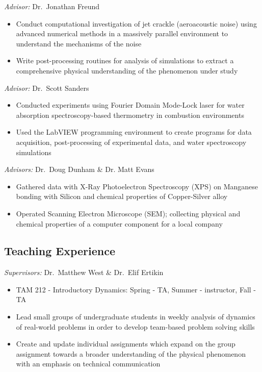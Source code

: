 \documentclass[11pt,letterpaper,sans]{moderncv}
\begin{document}
%
  {\textit{Advisor:} Dr.\ Jonathan Freund
  \begin{itemize}
  	\item Conduct computational investigation of jet crackle (aeroacoustic noise) using advanced numerical methods in a massively parallel environment to understand the mechanisms of the noise
	\item Write post-processing routines for analysis of simulations to extract a comprehensive physical understanding of the phenomenon under study
  \end{itemize}
  }

%
  {\textit{Advisor:} Dr.\ Scott Sanders
  \begin{itemize}
  	\item Conducted experiments using Fourier Domain Mode-Lock laser for water absorption spectroscopy-based thermometry in combustion environments
	\item Used the LabVIEW programming environment to create programs for data acquisition, post-processing of experimental data, and water spectroscopy simulations
  \end{itemize}
  }

%
  {\textit{Advisors:} Dr.\ Doug Dunham \& Dr. Matt Evans
  \begin{itemize}
  	\item Gathered data with X-Ray Photoelectron Spectroscopy (XPS) on Manganese bonding with Silicon and chemical properties of Copper-Silver alloy
	\item Operated Scanning Electron Microscope (SEM); collecting physical and chemical properties of a computer component for a local company
  \end{itemize}
  }


\subsection{Teaching Experience}

%
  {\textit{Supervisors:} Dr.\ Matthew West \& Dr.\ Elif Ertikin
  \begin{itemize}
	\item TAM 212 - Introductory Dynamics: Spring - TA, Summer - instructor, Fall - TA
  	\item Lead small groups of undergraduate students in weekly analysis of dynamics of real-world problems in order to develop team-based problem solving skills
	\item  Create and update individual assignments which expand on the group assignment towards a broader understanding of the physical phenomenon with an emphasis on technical communication
  \end{itemize}
  }
\end{document}
